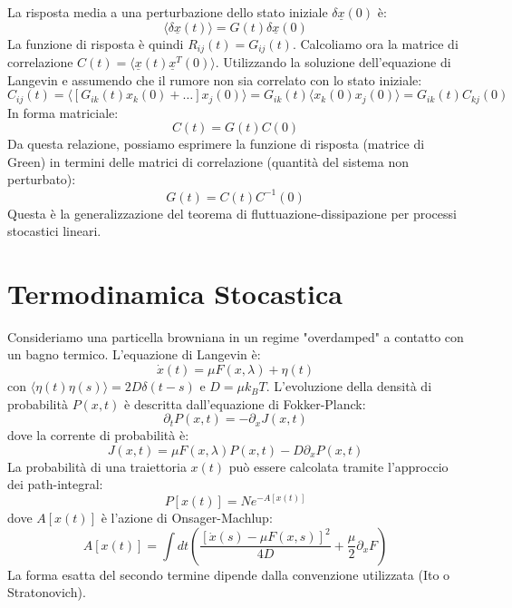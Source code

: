 La risposta media a una perturbazione dello stato iniziale $\delta\underline{x}(0)$ è:
\begin{equation}
 \langle \delta\underline{x}(t) \rangle = G(t) \delta\underline{x}(0)
\end{equation}
La funzione di risposta è quindi $R_{ij}(t) = G_{ij}(t)$.
Calcoliamo ora la matrice di correlazione $C(t) = \langle \underline{x}(t) \underline{x}^T(0) \rangle$. Utilizzando la soluzione dell'equazione di Langevin e assumendo che il rumore non sia correlato con lo stato iniziale:
\begin{equation}
 C_{ij}(t) = \langle [G_{ik}(t)x_k(0) + \dots] x_j(0) \rangle = G_{ik}(t) \langle x_k(0) x_j(0) \rangle = G_{ik}(t) C_{kj}(0)
\end{equation}
In forma matriciale:
\begin{equation}
 C(t) = G(t)C(0)
\end{equation}
Da questa relazione, possiamo esprimere la funzione di risposta (matrice di Green) in termini delle matrici di correlazione (quantità del sistema non perturbato):
\begin{equation}
 G(t) = C(t)C^{-1}(0)
\end{equation}
Questa è la generalizzazione del teorema di fluttuazione-dissipazione per processi stocastici lineari.

\section{Termodinamica Stocastica}

Consideriamo una particella browniana in un regime "overdamped" a contatto con un bagno termico. L'equazione di Langevin è:
\begin{equation}
 \dot{x}(t) = \mu F(x, \lambda) + \eta(t)
\end{equation}
con $\langle \eta(t) \eta(s) \rangle = 2D \delta(t-s)$ e $D = \mu k_B T$.
L'evoluzione della densità di probabilità $P(x,t)$ è descritta dall'equazione di Fokker-Planck:
\begin{equation}
 \partial_t P(x,t) = - \partial_x J(x,t)
\end{equation}
dove la corrente di probabilità è:
\begin{equation}
 J(x,t) = \mu F(x, \lambda) P(x,t) - D \partial_x P(x,t)
\end{equation}
La probabilità di una traiettoria $x(t)$ può essere calcolata tramite l'approccio dei path-integral:
\begin{equation}
 P[x(t)] = N e^{-A[x(t)]}
\end{equation}
dove $A[x(t)]$ è l'azione di Onsager-Machlup:
\begin{equation}
 A[x(t)] = \int dt \left( \frac{[\dot{x}(s) - \mu F(x,s)]^2}{4D} + \frac{\mu}{2} \partial_x F \right)
\end{equation}
La forma esatta del secondo termine dipende dalla convenzione utilizzata (Ito o Stratonovich).


